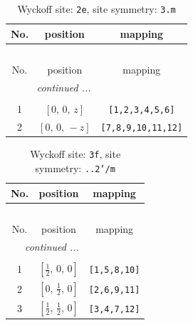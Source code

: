 \documentclass[fleqn,8pt]{jsarticle}
\begin{document}
\begin{longtable}{ccc}
\caption{Wyckoff site: {\tt 2e}, site symmetry: {\tt 3.m}}
 \\
 \hline \hline
No. & position & mapping \\ \hline \endfirsthead

\multicolumn{2}{l}{\tablename\ \thetable{}} \\
 \hline \hline
No. & position & mapping \\ \hline \endhead

 \hline \hline
\multicolumn{2}{r}{\footnotesize\it continued ...} \\ \endfoot

 \hline \hline
\multicolumn{2}{r}{} \\ \endlastfoot

1 & $\left[ 0,\, 0,\, z \right]$ & {\tt [1,2,3,4,5,6]} \\ \hline
2 & $\left[ 0,\, 0,\, - z \right]$ & {\tt [7,8,9,10,11,12]} \\
\end{longtable}
\renewcommand{\arraystretch}{1.2}
\begin{longtable}{ccc}
\caption{Wyckoff site: {\tt 3f}, site symmetry: {\tt ..2'/m}}
 \\
 \hline \hline
No. & position & mapping \\ \hline \endfirsthead

\multicolumn{2}{l}{\tablename\ \thetable{}} \\
 \hline \hline
No. & position & mapping \\ \hline \endhead

 \hline \hline
\multicolumn{2}{r}{\footnotesize\it continued ...} \\ \endfoot

 \hline \hline
\multicolumn{2}{r}{} \\ \endlastfoot

1 & $\left[ \frac{1}{2},\, 0,\, 0 \right]$ & {\tt [1,5,8,10]} \\ \hline
2 & $\left[ 0,\, \frac{1}{2},\, 0 \right]$ & {\tt [2,6,9,11]} \\ \hline
3 & $\left[ \frac{1}{2},\, \frac{1}{2},\, 0 \right]$ & {\tt [3,4,7,12]} \\
\end{longtable}
\renewcommand{\arraystretch}{1.2}
\end{document}
